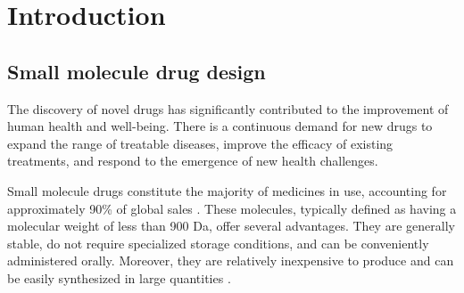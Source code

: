 \chapter{Introduction\label{chap:introduction}}
\section{Small molecule drug design\label{sec:drug-design}}

The discovery of novel drugs has significantly contributed to the improvement of human health and
well-being. There is a continuous demand for new drugs to expand the range of treatable diseases,
improve the efficacy of existing treatments, and respond to the emergence of new health challenges.

Small molecule drugs constitute the majority of medicines in use, accounting for approximately 90\%
of global sales \citep{makurvetBiologicsVsSmall2021}. These molecules, typically defined as having a
molecular weight of less than 900 Da, offer several advantages. They are generally stable, do not
require specialized storage conditions, and can be conveniently administered orally. Moreover, they
are relatively inexpensive to produce and can be easily synthesized in large quantities
\citep{southeyIntroductionSmallMolecule2023}.

